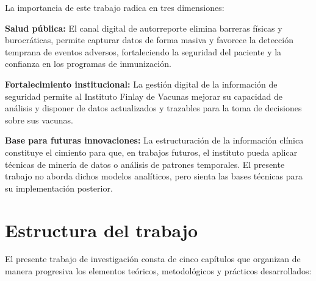 La importancia de este trabajo radica en tres dimensiones:

\textbf{Salud pública:} El canal digital de autorreporte elimina barreras físicas y burocráticas, permite capturar datos de forma masiva y favorece la detección temprana de eventos adversos, fortaleciendo la seguridad del paciente y la confianza en los programas de inmunización.

\textbf{Fortalecimiento institucional:} La gestión digital de la información de seguridad permite al Instituto Finlay de Vacunas mejorar su capacidad de análisis y disponer de datos actualizados y trazables para la toma de decisiones sobre sus vacunas.

\textbf{Base para futuras innovaciones:} La estructuración de la información clínica constituye el cimiento para que, en trabajos futuros, el instituto pueda aplicar técnicas de minería de datos o análisis de patrones temporales. El presente trabajo no aborda dichos modelos analíticos, pero sienta las bases técnicas para su implementación posterior.




\section{Estructura del trabajo}\label{section:estructuraTrabajo}

El presente trabajo de investigación consta de cinco capítulos que organizan de manera progresiva los elementos teóricos, metodológicos y prácticos desarrollados:

